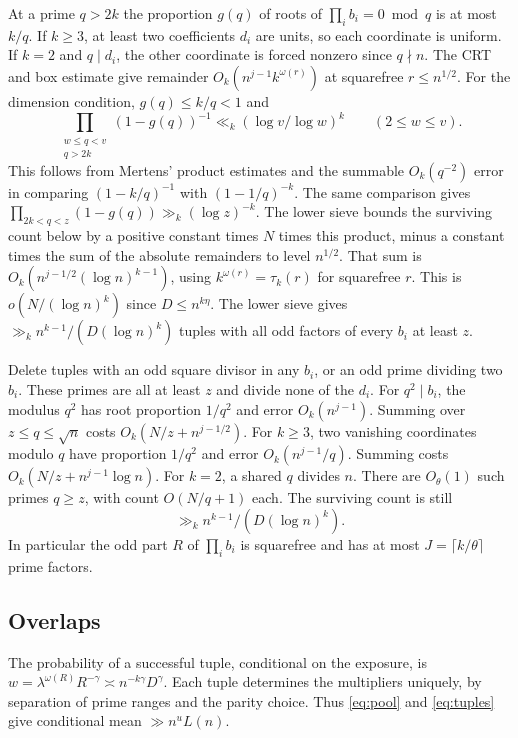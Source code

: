 \documentclass[11pt]{article}
\begin{document}
At a prime \(q>2k\) the proportion \(g(q)\) of roots of
\(\prod_i b_i=0\bmod q\) is at most \(k/q\).
If \(k\ge3\), at least two coefficients \(d_i\) are units, so each
coordinate is uniform. If \(k=2\) and \(q\mid d_i\), the other
coordinate is forced nonzero since \(q\nmid n\).
The CRT and box estimate give remainder
\(O_k(n^{j-1}k^{\omega(r)})\) at squarefree \(r\le n^{1/2}\).
For the dimension condition, \(g(q)\le k/q<1\) and
\[
 \prod_{\substack{w\le q<v\\q>2k}}(1-g(q))^{-1}
                \ll_k(\log v/\log w)^k\qquad(2\le w\le v).
\]
This follows from Mertens' product estimates \cite[Theorems~7--8]{RS}
and the summable \(O_k(q^{-2})\) error in comparing
\((1-k/q)^{-1}\) with \((1-1/q)^{-k}\).
The same comparison gives
\(\prod_{2k<q<z}(1-g(q))\gg_k(\log z)^{-k}\).
The lower sieve bounds the surviving count below by a positive
constant times \(N\) times this product, minus a constant times
the sum of the absolute remainders to level \(n^{1/2}\).
That sum is
\(O_k(n^{j-1/2}(\log n)^{k-1})\), using \(k^{\omega(r)}=\tau_k(r)\)
for squarefree \(r\). This is \(o(N/(\log n)^k)\) since
\(D\le n^{k\eta}\). The lower sieve gives
\(\gg_k n^{k-1}/(D(\log n)^k)\) tuples with all odd factors of
every \(b_i\) at least \(z\).

Delete tuples with an odd square divisor in any \(b_i\), or an
odd prime dividing two \(b_i\). These primes are all at least \(z\)
and divide none of the \(d_i\). For \(q^2\mid b_i\), the modulus
\(q^2\) has root proportion \(1/q^2\) and error \(O_k(n^{j-1})\).
Summing over \(z\le q\le\sqrt n\) costs
\(O_k(N/z+n^{j-1/2})\). For \(k\ge3\), two vanishing coordinates
modulo \(q\) have proportion \(1/q^2\) and error
\(O_k(n^{j-1}/q)\). Summing costs \(O_k(N/z+n^{j-1}\log n)\).
For \(k=2\), a shared \(q\) divides \(n\). There are
\(O_\theta(1)\) such primes \(q\ge z\), with count \(O(N/q+1)\)
each. The surviving count is still
\begin{equation}\label{eq:tuples}
                    \gg_k n^{k-1}/(D(\log n)^k).
\end{equation}
In particular the odd part \(R\) of \(\prod_i b_i\) is squarefree
and has at most \(J=\lceil k/\theta\rceil\) prime factors.

\subsection{Overlaps}

The probability of a successful tuple, conditional on the exposure,
is \(w=\lambda^{\omega(R)}R^{-\gamma}
\asymp n^{-k\gamma}D^\gamma\). Each tuple determines the
multipliers uniquely, by separation of prime ranges and the parity
choice. Thus \eqref{eq:pool} and \eqref{eq:tuples} give conditional
mean \(\gg n^u L(n)\).
\end{document}
